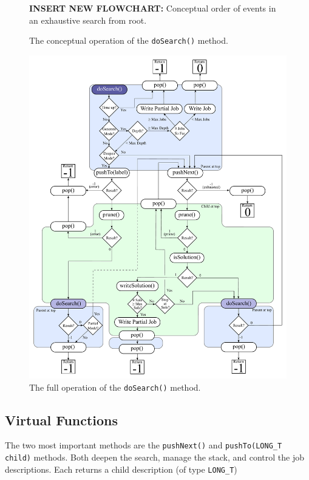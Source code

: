 \documentclass[11pt]{article}
\begin{document}
	
\begin{figure}[h]
	\centering
	\parbox{5in}{\Large {\bf INSERT NEW FLOWCHART:} Conceptual order of events in an exhaustive search from root.}
	\caption{\label{fig:doSearchSmall}The conceptual operation of the \texttt{doSearch()} method.}
\end{figure}
	
\begin{figure}[p]
	\centering
	\includegraphics[height=0.95\textheight]{figures/doSearchFlowchart.pdf}
	\caption{\label{fig:doSearch}The full operation of the \texttt{doSearch()} method.}
\end{figure}

\subsection{Virtual Functions}

The two most important methods are the
	\texttt{pushNext()} and \texttt{pushTo(LONG\_T child)} methods.
Both deepen the search, 
	manage the stack, 
	and control the job descriptions.
Each returns a child description (of type \texttt{LONG\_T})
	
\end{document}
